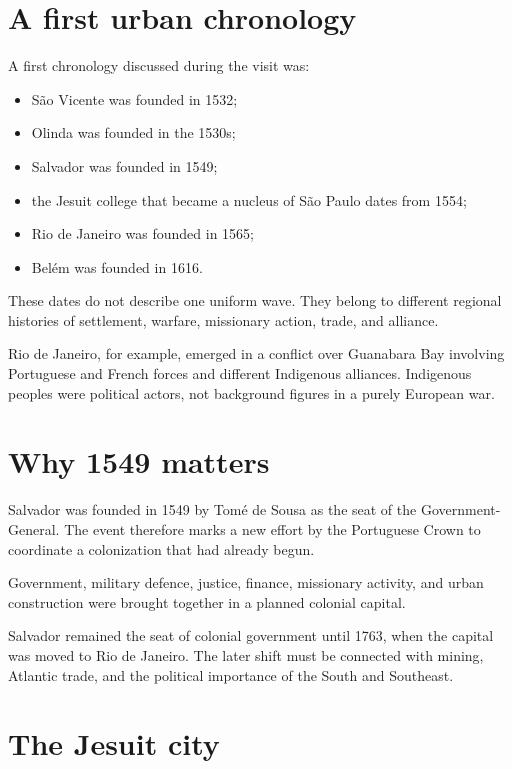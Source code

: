 \section{A first urban chronology}
\label{section-urban-chronology}

A first chronology discussed during the
visit was:

\begin{itemize}
\item S\~ao Vicente was founded in 1532;
\item Olinda was founded in the 1530s;
\item Salvador was founded in 1549;
\item the Jesuit college that became a
nucleus of S\~ao Paulo dates from 1554;
\item Rio de Janeiro was founded in 1565;
\item Bel\'em was founded in 1616.
\end{itemize}

These dates do not describe one uniform
wave.  They belong to different regional
histories of settlement, warfare,
missionary action, trade, and alliance.

Rio de Janeiro, for example, emerged in a
conflict over Guanabara Bay involving
Portuguese and French forces and different
Indigenous alliances.  Indigenous peoples
were political actors, not background
figures in a purely European war.

\section{Why 1549 matters}
\label{section-why-1549-matters}

Salvador was founded in 1549 by Tom\'e de
Sousa as the seat of the Government-General.
The event therefore marks a new effort by
the Portuguese Crown to coordinate a
colonization that had already begun.

Government, military defence, justice,
finance, missionary activity, and urban
construction were brought together in a
planned colonial capital.

Salvador remained the seat of colonial
government until 1763, when the capital was
moved to Rio de Janeiro.  The later shift
must be connected with mining, Atlantic
trade, and the political importance of the
South and Southeast.

\section{The Jesuit city}
\label{section-jesuit-city}

